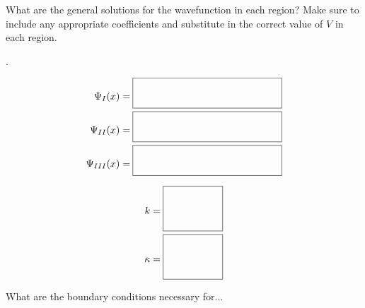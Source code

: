 	\begin{questions}
	
		\question What are the general solutions for the wavefunction in each region? Make sure to include any appropriate coefficients and substitute in the correct value of $V$ in each region.
		
			\begin{minipage}{0.1\textwidth}.
			\end{minipage}
			\begin{minipage}{0.4\textwidth}
			\begingroup
\addtolength{\jot}{1em}
			\begin{align*}
				\Psi_I(x) = \answerbox{150}\\
				\Psi_{II}(x) = \answerbox{150}\\
				\Psi_{III}(x) = \answerbox{150}
			\end{align*}
			\endgroup
			\end{minipage}
			\begin{minipage}{0.4\textwidth}
			\begingroup
\addtolength{\jot}{1em}
			\begin{align*}
				k = \answerboxtall{60}\\
				\kappa = \answerboxtall{60}
			\end{align*}
			\endgroup
			\end{minipage}
			
			\vspace{0.1in}
		\question What are the boundary conditions necessary for...
		
\end{questions}
